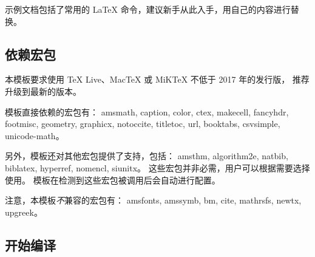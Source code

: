 \documentclass[a4paper]{ltxdoc}
\DeclareRobustCommand\pkg{\textsf}
\begin{document}
示例文档包括了常用的 \LaTeX{} 命令，建议新手从此入手，用自己的内容进行替换。


\subsection{依赖宏包}

本模板要求使用 TeX Live、MacTeX 或 MiKTeX 不低于 2017 年的发行版，
推荐升级到最新的版本。

模板直接依赖的宏包有：
\pkg{amsmath},
\pkg{caption},
\pkg{color},
\pkg{ctex},
\pkg{makecell},
\pkg{fancyhdr},
\pkg{footmisc},
\pkg{geometry},
\pkg{graphicx},
\pkg{notoccite},
\pkg{titletoc},
\pkg{url},
\pkg{booktabs},
\pkg{csvsimple},
\pkg{unicode-math}。

另外，模板还对其他宏包提供了支持，包括：
\pkg{amsthm},
\pkg{algorithm2e},
\pkg{natbib},
\pkg{biblatex},
\pkg{hyperref},
\pkg{nomencl},
\pkg{siunitx}。
这些宏包并非必需，用户可以根据需要选择使用。
模板在检测到这些宏包被调用后会自动进行配置。

注意，本模板\emph{不}兼容的宏包有：
\pkg{amsfonts},
\pkg{amssymb},
\pkg{bm},
\pkg{cite},
\pkg{mathrsfs},
\pkg{newtx},
\pkg{upgreek}。


\subsection{开始编译}
\end{document}
